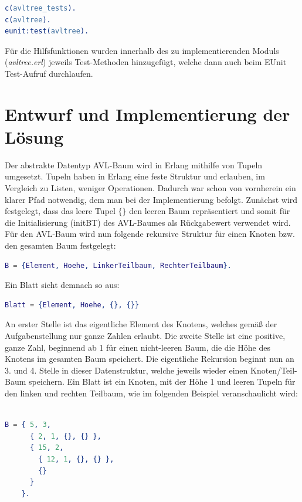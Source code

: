 \documentclass{article}
\begin{document}
\begin{lstlisting}[language=erlang]
c(avltree_tests).
c(avltree).
eunit:test(avltree).
\end{lstlisting}

	Für die Hilfsfunktionen wurden innerhalb des zu implementierenden Moduls (\textit{avltree.erl}) jeweils Test-Methoden hinzugefügt, welche dann auch beim EUnit Test-Aufruf durchlaufen.
  
  \newpage
  \section{Entwurf und Implementierung der Lösung}
  	Der abstrakte Datentyp AVL-Baum wird in Erlang mithilfe von Tupeln umgesetzt. Tupeln haben in Erlang eine feste Struktur und erlauben, im Vergleich zu Listen, weniger Operationen. Dadurch war schon von vornherein ein klarer Pfad notwendig, dem man bei der Implementierung befolgt. Zunächst wird festgelegt, dass das leere Tupel $\{\}$ den leeren Baum repräsentiert und somit für die Initialisierung (initBT) des AVL-Baumes als Rückgabewert verwendet wird. 
    \newline
    Für den AVL-Baum wird nun folgende rekursive Struktur für einen Knoten bzw. den gesamten Baum festgelegt:
    
\begin{lstlisting}[language=erlang]
B = {Element, Hoehe, LinkerTeilbaum, RechterTeilbaum}.
\end{lstlisting}
    
    Ein Blatt sieht demnach so aus:
    
\begin{lstlisting}[language=erlang]
Blatt = {Element, Hoehe, {}, {}}
\end{lstlisting}
    
	An erster Stelle ist das eigentliche Element des Knotens, welches gemäß der Aufgabenstellung nur ganze Zahlen erlaubt. Die zweite Stelle ist eine positive, ganze Zahl, beginnend ab 1 für einen nicht-leeren Baum, die die Höhe des Knotens im gesamten Baum speichert. Die eigentliche Rekursion beginnt nun an 3. und 4. Stelle in dieser Datenstruktur, welche jeweils wieder einen Knoten/Teil-Baum speichern. Ein Blatt ist ein Knoten, mit der Höhe 1 und leeren Tupeln für den linken und rechten Teilbaum, wie im folgenden Beispiel veranschaulicht wird:

    \begin{lstlisting}[language=erlang]

B = { 5, 3, 
      { 2, 1, {}, {} }, 
      { 15, 2, 
        { 12, 1, {}, {} }, 
        {}
      }
    }.

    \end{lstlisting}
    
\end{document}
